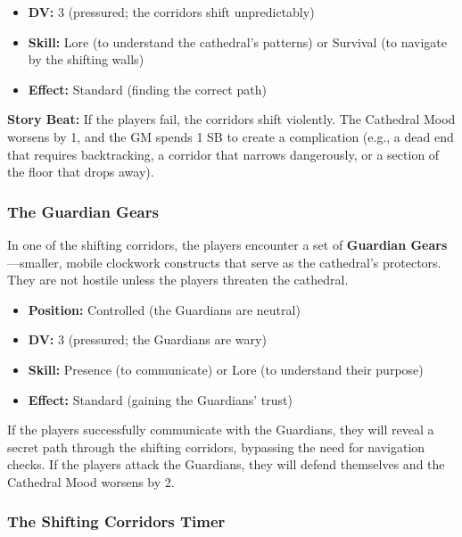 \documentclass{article}
\begin{document}
\begin{itemize}
    \item \textbf{DV:} 3 (pressured; the corridors shift unpredictably)
    \item \textbf{Skill:} Lore (to understand the cathedral's patterns) or Survival (to navigate by the shifting walls)
    \item \textbf{Effect:} Standard (finding the correct path)
\end{itemize}

\begin{storybox}
\textbf{Story Beat:} If the players fail, the corridors shift violently. The Cathedral Mood worsens by 1, and the GM spends 1 SB to create a complication (e.g., a dead end that requires backtracking, a corridor that narrows dangerously, or a section of the floor that drops away).
\end{storybox}

\subsubsection{The Guardian Gears}

In one of the shifting corridors, the players encounter a set of \textbf{Guardian Gears}---smaller, mobile clockwork constructs that serve as the cathedral's protectors. They are not hostile unless the players threaten the cathedral.

\begin{itemize}
    \item \textbf{Position:} Controlled (the Guardians are neutral)
    \item \textbf{DV:} 3 (pressured; the Guardians are wary)
    \item \textbf{Skill:} Presence (to communicate) or Lore (to understand their purpose)
    \item \textbf{Effect:} Standard (gaining the Guardians' trust)
\end{itemize}

If the players successfully communicate with the Guardians, they will reveal a secret path through the shifting corridors, bypassing the need for navigation checks. If the players attack the Guardians, they will defend themselves and the Cathedral Mood worsens by 2.

\subsubsection{The Shifting Corridors Timer }
\end{document}
